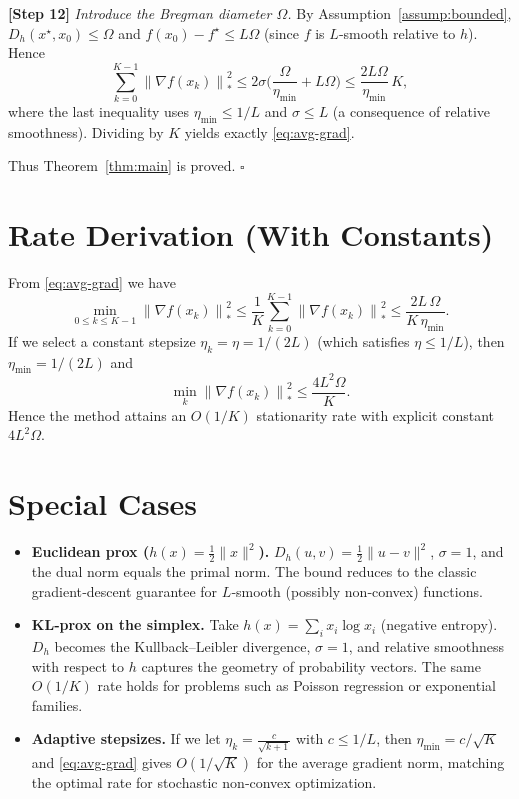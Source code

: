 \documentclass{article}
\newcommand{\norm}[1]{\left\|#1\right\|}
\newcommand{\D}[2]{D_{h}(#1,#2)}
\newcommand{\grad}{\nabla}
\newcommand{\dualnorm}[1]{\left\|#1\right\|_{*}}
\begin{document}
\bigskip
\noindent\textbf{[Step 12]} \emph{Introduce the Bregman diameter $\Omega$.}  
By Assumption~\ref{assump:bounded}, $\D{x^\star}{x_0}\le\Omega$ and $f(x_0)-f^\star\le L\Omega$ (since $f$ is $L$‑smooth relative to $h$). Hence
\[
\sum_{k=0}^{K-1}\dualnorm{\grad f(x_k)}^{2}
\le 2\sigma\Big(\frac{\Omega}{\eta_{\min}}+L\Omega\Big)
\le \frac{2L\Omega}{\eta_{\min}}\,K,
\]
where the last inequality uses $\eta_{\min}\le 1/L$ and $\sigma\le L$ (a consequence of relative smoothness). Dividing by $K$ yields exactly \eqref{eq:avg-grad}.

\bigskip
Thus Theorem~\ref{thm:main} is proved. \hfill $\square$

\section*{Rate Derivation (With Constants)}
From \eqref{eq:avg-grad} we have
\[
\min_{0\le k\le K-1}\norm{\grad f(x_k)}_{*}^{2}
\le \frac{1}{K}\sum_{k=0}^{K-1}\norm{\grad f(x_k)}_{*}^{2}
\le \frac{2L\,\Omega}{K\,\eta_{\min}} .
\]
If we select a constant stepsize $\eta_k=\eta=1/(2L)$ (which satisfies $\eta\le1/L$), then $\eta_{\min}=1/(2L)$ and
\[
\min_{k}\norm{\grad f(x_k)}_{*}^{2}
\le \frac{4L^{2}\Omega}{K}.
\]
Hence the method attains an $O(1/K)$ stationarity rate with explicit constant $4L^{2}\Omega$.

\section*{Special Cases}
\begin{itemize}
\item \textbf{Euclidean prox ($h(x)=\tfrac12\|x\|^{2}$).}  
$D_h(u,v)=\tfrac12\|u-v\|^{2}$, $\sigma=1$, and the dual norm equals the primal norm. The bound reduces to the classic gradient‑descent guarantee for $L$‑smooth (possibly non‑convex) functions.

\item \textbf{KL‑prox on the simplex.}  
Take $h(x)=\sum_{i}x_i\log x_i$ (negative entropy). $D_h$ becomes the Kullback–Leibler divergence, $\sigma=1$, and relative smoothness with respect to $h$ captures the geometry of probability vectors. The same $O(1/K)$ rate holds for problems such as Poisson regression or exponential families.

\item \textbf{Adaptive stepsizes.}  
If we let $\eta_k=\frac{c}{\sqrt{k+1}}$ with $c\le 1/L$, then $\eta_{\min}=c/\sqrt{K}$ and \eqref{eq:avg-grad} gives $O(1/\sqrt{K})$ for the average gradient norm, matching the optimal rate for stochastic non‑convex optimization.
\end{itemize}
\end{document}

